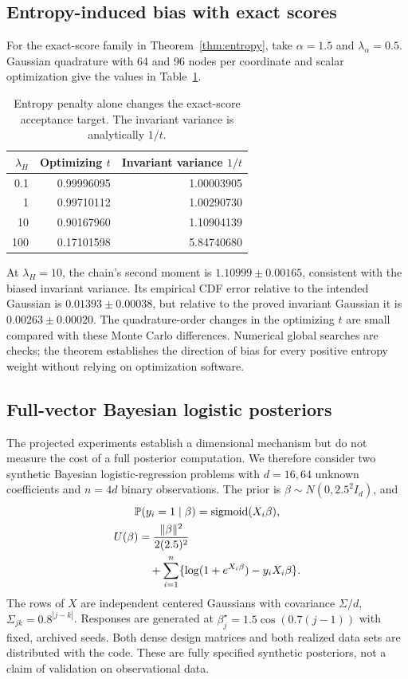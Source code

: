 \documentclass[pdflatex,iicol,sn-mathphys-ay]{sn-jnl}
\theoremstyle{definition}\newtheorem{definition}[theorem]{Definition}
\theoremstyle{remark}\newtheorem{remark}[theorem]{Remark}
\numberwithin{equation}{section}
\newcommand{\1}{\mathbf 1}
\begin{document}
\subsection{Entropy-induced bias with exact scores}
For the exact-score family in Theorem~\ref{thm:entropy}, take $\alpha=1.5$ and $\lambda_\alpha=0.5$. Gaussian quadrature with 64 and 96 nodes per coordinate and scalar optimization give the values in Table~\ref{tab:entropy}.
\begin{table}[t]\centering
\caption{Entropy penalty alone changes the exact-score acceptance target. The invariant variance is analytically $1/t$.}\label{tab:entropy}
\begin{tabular}{@{}rrr@{}}\toprule
$\lambda_H$ & Optimizing $t$ & Invariant variance $1/t$\\\midrule
0.1 &0.99996095&1.00003905\\
1 &0.99710112&1.00290730\\
10 &0.90167960&1.10904139\\
100 &0.17101598&5.84740680\\\bottomrule
\end{tabular}
\end{table}
At $\lambda_H=10$, the chain's second moment is $1.10999\pm0.00165$, consistent with the biased invariant variance. Its empirical CDF error relative to the intended Gaussian is $0.01393\pm0.00038$, but relative to the proved invariant Gaussian it is $0.00263\pm0.00020$. The quadrature-order changes in the optimizing $t$ are small compared with these Monte Carlo differences. Numerical global searches are checks; the theorem establishes the direction of bias for every positive entropy weight without relying on optimization software.



\subsection{Full-vector Bayesian logistic posteriors}\label{sec:bayesian}
The projected experiments establish a dimensional mechanism but do not measure the cost of a full posterior computation. We therefore consider two synthetic Bayesian logistic-regression problems with $d=16,64$ unknown coefficients and $n=4d$ binary observations. The prior is $\beta\sim N(0,2.5^2I_d)$, and
\begin{equation}
\begin{gathered}
 \mathbb P(y_i=1\mid\beta)=\operatorname{sigmoid}(X_i\beta),\\
 \begin{aligned}
 U(\beta)&=\frac{\|\beta\|^2}{2(2.5)^2}\\
 &\quad+\sum_{i=1}^n\{\log(1+e^{X_i\beta})-y_iX_i\beta\}.
 \end{aligned}
\end{gathered}\label{eq:logistic}
\end{equation}
The rows of $X$ are independent centered Gaussians with covariance $\Sigma/d$, $\Sigma_{jk}=0.8^{|j-k|}$. Responses are generated at $\beta_j^\star=1.5\cos(0.7(j-1))$ with fixed, archived seeds. Both dense design matrices and both realized data sets are distributed with the code. These are fully specified synthetic posteriors, not a claim of validation on observational data.
\end{document}
